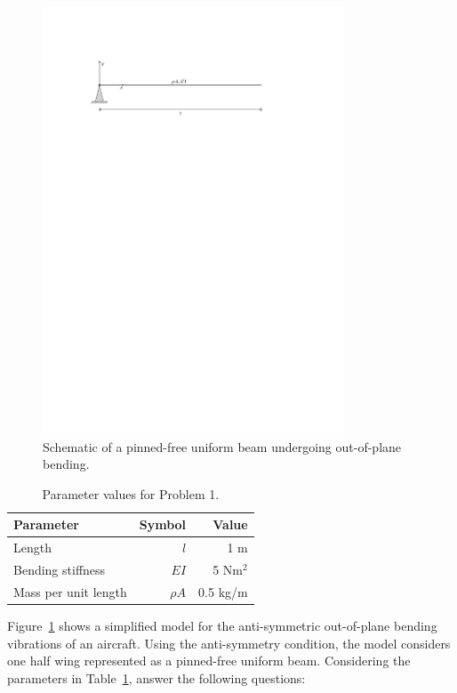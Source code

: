 \documentclass[11pt,a4paper]{article}
\begin{document}
\begin{figure}[htpt!]
	\centering
	\includegraphics[width=0.8\textwidth]{figures/beam1.pdf}
	\caption{Schematic of a pinned-free uniform beam undergoing out-of-plane bending.}
	\label{f1}
\end{figure}
%
\begin{table}[htpt!]
	\centering
	\caption{Parameter values for Problem 1. \label{t1}}
	\vspace{2mm}
	\begin{tabular}{lrr}
		\toprule
		Parameter & Symbol & Value \\
		\midrule 
		Length & $l$ & 1 m \\
        Bending stiffness & $EI$ & 5 Nm$^2$\\
        Mass per unit length & $\rho A$ & 0.5 kg/m\\
		\bottomrule
	\end{tabular}
\end{table}
%
Figure~\ref{f1} shows a simplified model for the anti-symmetric out-of-plane bending vibrations of an aircraft. Using the anti-symmetry condition, the model considers one half wing represented as a pinned-free uniform beam. Considering the parameters in Table~\ref{t1}, answer the following questions:
\end{document}
